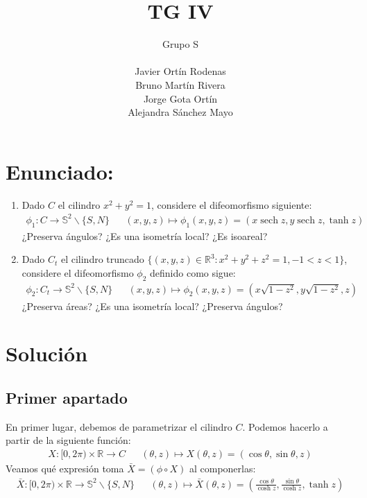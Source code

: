 \documentclass{article}
\title{TG IV}
\author{
    \large{Grupo S} \\\\
    Javier Ortín Rodenas \\
    Bruno Martín Rivera \\
    Jorge Gota Ortín \\
    Alejandra Sánchez Mayo
}
\date{}
\newcommand{\sech}[1]{\operatorname{sech} #1}
\begin{document}
\maketitle
\noindent
\section{Enunciado:}
\begin{enumerate}
    \item Dado $C$ el cilindro $x^2 + y^2 = 1$, considere el difeomorfismo siguiente:
        \begin{align*}
            \phi_1 : C \longrightarrow \mathbb{S}^2\backslash\{S, N\} &&
            (x,y,z) \longmapsto \phi_1(x,y,z) = \left(x \sech{z}, y \sech{z}, \tanh{z}\right)
        \end{align*}
        ¿Preserva ángulos? ¿Es una isometría local? ¿Es isoareal?
        \\
    \item Dado $C_t$ el cilindro truncado $\{(x,y,z) \in \mathbb{R}^3 : x^2 + y^2 + z^2 = 1, -1<z<1\}$,
        considere el difeomorfismo $\phi_2$ definido como sigue:
        \begin{align*}
            \phi_2 : C_t \longrightarrow \mathbb{S}^2\backslash\{S, N\} &&
            (x,y,z) \longmapsto \phi_2(x,y,z) = \left(x \sqrt{1-z^2}, y\sqrt{1-z^2} ,z\right)
        \end{align*}           
        ¿Preserva áreas? ¿Es una isometría local? ¿Preserva ángulos?
\end{enumerate}

\section{Solución}
\subsection{Primer apartado}
\hspace{1mm} En primer lugar, debemos de parametrizar el cilindro $C$.
Podemos hacerlo a partir de la siguiente función:
\begin{align*}
    X : [0, 2\pi) \times \mathbb{R} \longrightarrow C&&
    (\theta, z) \longmapsto X(\theta, z) = \left(\cos\theta, \sin\theta, z\right)
\end{align*}
\vspace{1mm}
Veamos qué expresión toma $\bar{X} = (\phi \circ X)$ al componerlas:
\begin{align*}
    \bar{X} : [0, 2\pi) \times \mathbb{R} \longrightarrow \mathbb{S}^2 \backslash \{S,N\}&&
    (\theta, z) \longmapsto \bar{X}(\theta, z) =
        \left(\frac{\cos \theta}{\cosh z}, \frac{\sin \theta}{\cosh z}, \tanh z\right)
\end{align*}
\end{document}
